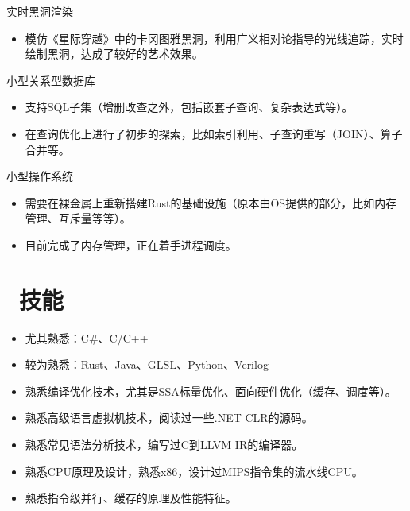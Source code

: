 \documentclass{resume}
\begin{document}
实时黑洞渲染
\begin{itemize}
  \item 模仿《星际穿越》中的卡冈图雅黑洞，利用广义相对论指导的光线追踪，实时绘制黑洞，达成了较好的艺术效果。
\end{itemize}

小型关系型数据库
\begin{itemize}
  \item 支持SQL子集（增删改查之外，包括嵌套子查询、复杂表达式等）。
  \item 在查询优化上进行了初步的探索，比如索引利用、子查询重写（JOIN）、算子合并等。
\end{itemize}

小型操作系统
\begin{itemize}
  \item 需要在裸金属上重新搭建Rust的基础设施（原本由OS提供的部分，比如内存管理、互斥量等等）。
  \item 目前完成了内存管理，正在着手进程调度。
\end{itemize}


\section{\faCogs\ 技能}

\begin{itemize}
  \item 尤其熟悉：C\#、C/C++
  \item 较为熟悉：Rust、Java、GLSL、Python、Verilog
\end{itemize}

\begin{itemize}
  \item 熟悉编译优化技术，尤其是SSA标量优化、面向硬件优化（缓存、调度等）。
  \item 熟悉高级语言虚拟机技术，阅读过一些.NET CLR的源码。
  \item 熟悉常见语法分析技术，编写过C到LLVM IR的编译器。
\end{itemize}

\begin{itemize}
  \item 熟悉CPU原理及设计，熟悉x86，设计过MIPS指令集的流水线CPU。
  \item 熟悉指令级并行、缓存的原理及性能特征。
\end{itemize}


  
\end{document}
